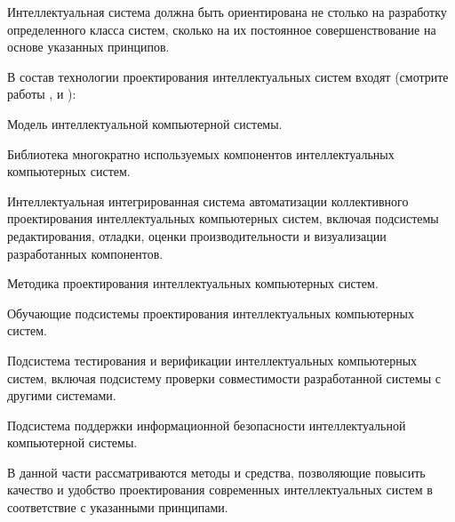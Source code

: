 \begin{partbacktext}
Интеллектуальная система должна быть ориентирована не столько на разработку определенного класса систем, сколько на их постоянное совершенствование на основе указанных принципов.

В состав технологии проектирования интеллектуальных систем входят (смотрите работы ,  и ):
\begin{textitemize}
	\item{Модель интеллектуальной компьютерной системы.}
	\item{Библиотека многократно используемых компонентов интеллектуальных компьютерных систем.}
	\item{Интеллектуальная интегрированная система автоматизации коллективного проектирования интеллектуальных компьютерных систем, включая подсистемы редактирования, отладки, оценки производительности и визуализации разработанных компонентов.}
	\item{Методика проектирования интеллектуальных компьютерных систем.}
	\item{Обучающие подсистемы проектирования интеллектуальных компьютерных систем.}
	\item{Подсистема тестирования и верификации интеллектуальных компьютерных систем, включая подсистему проверки совместимости разработанной системы с другими системами.}
	\item{Подсистема поддержки информационной безопасности интеллектуальной компьютерной системы.}
\end{textitemize}

В данной части рассматриваются методы и средства, позволяющие повысить качество и удобство проектирования современных интеллектуальных систем в соответствие с указанными принципами.
\end{partbacktext}




